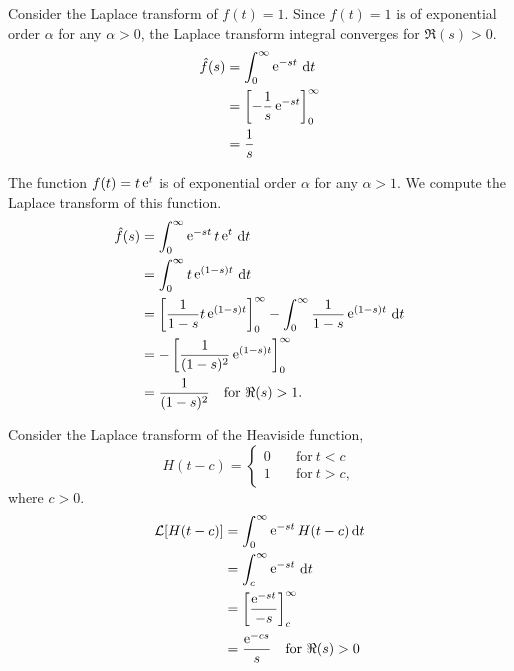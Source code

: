 \begin{Example}
  Consider the Laplace transform of $f(t) = 1$.
  Since $f(t) = 1$ is of exponential order $\alpha$ for any $\alpha > 0$,
  the Laplace transform integral converges for $\Re(s) > 0$.
  \begin{align*}
    \hat{f}(s)    
    &= \int_0^\infty \mathop{\mathrm{e}}\nolimits^{-s t}\,\mathrm{d} t \\
    &= \left[-\frac{1}{s} \mathop{\mathrm{e}}\nolimits^{-s t}\right]_0^\infty \\
    &= \frac{1}{s}
  \end{align*}
\end{Example}








\begin{Example}
  The function $f(t) = t \mathop{\mathrm{e}}\nolimits^t$ is of exponential order $\alpha$ for any
  $\alpha > 1$.  We compute the Laplace transform of this function.
  \begin{align*}
    \hat{f}(s)    
    &= \int_0^\infty \mathop{\mathrm{e}}\nolimits^{-s t} t \mathop{\mathrm{e}}\nolimits^{t}\,\mathrm{d} t \\
    &= \int_0^\infty t \mathop{\mathrm{e}}\nolimits^{(1-s)t}\,\mathrm{d} t \\
    &= \left[\frac{1}{1-s} t \mathop{\mathrm{e}}\nolimits^{(1-s)t}\right]_0^\infty - 
    \int_0^\infty \frac{1}{1-s}\mathop{\mathrm{e}}\nolimits^{(1-s)t}\,\mathrm{d} t \\
    &= -\left[\frac{1}{(1-s)^2}\mathop{\mathrm{e}}\nolimits^{(1-s)t}\right]_0^\infty \\
    &= \frac{1}{(1-s)^2} \quad \mathrm{for}\ \Re(s) > 1.
  \end{align*}
\end{Example}








\begin{Example}
  Consider the Laplace transform of the Heaviside function,
  \[
  H(t-c) = \begin{cases}
    0\quad &\mathrm{for}\ t < c \\
    1\quad &\mathrm{for}\ t > c,
  \end{cases}
  \]
  where $c>0$.
  \begin{align*}
    \mathcal{L}[H(t-c)]
    &= \int_0^\infty \mathop{\mathrm{e}}\nolimits^{-s t} H(t-c)\,\mathrm{d} t \\
    &= \int_c^\infty \mathop{\mathrm{e}}\nolimits^{-s t}\,\mathrm{d} t \\
    &= \left[\frac{\mathop{\mathrm{e}}\nolimits^{-s t}}{-s}\right]_c^\infty \\
    &= \frac{\mathop{\mathrm{e}}\nolimits^{-c s}}{s} \quad \mathrm{for}\ \Re(s) > 0
  \end{align*}
\end{Example}







